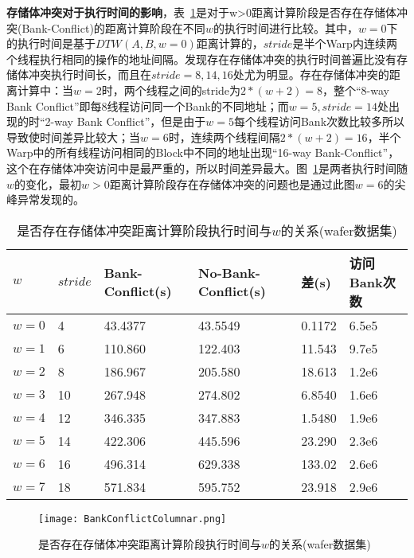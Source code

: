 \textbf{存储体冲突对于执行时间的影响}，表~\ref{tab:BankConflictTimeWithW}是对于w>0距离计算阶段是否存在存储体冲突(Bank-Conflict)的距离计算阶段在不同$w$的执行时间进行比较。其中，$w=0$下的执行时间是基于$DTW(A,B,w=0)$距离计算的，$stride$是半个Warp内连续两个线程执行相同的操作的地址间隔。发现存在存储体冲突的执行时间普遍比没有存储体冲突执行时间长，而且在$stride=8,14,16$处尤为明显。存在存储体冲突的距离计算中：当$w=2$时，两个线程之间的stride为$2*(w+2)=8$，整个“8-way Bank Conflict”即每8线程访问同一个Bank的不同地址；而$w=5,stride=14$处出现的时“2-way Bank Conflict”，但是由于$w=5$每个线程访问Bank次数比较多所以导致使时间差异比较大；当$w=6$时，连续两个线程间隔$2*(w+2)=16$，半个Warp中的所有线程访问相同的Block中不同的地址出现“16-way Bank-Conflict”，这个在存储体冲突访问中是最严重的，所以时间差异最大。图~\ref{fig:BankConflictColumnar}是两者执行时间随$w$的变化，最初$w>0$距离计算阶段存在存储体冲突的问题也是通过此图$w=6$的尖峰异常发现的。

\begin{table}[htbp]
	\centering
	\begin{minipage}{0.9\textwidth}
		\caption{是否存在存储体冲突距离计算阶段执行时间与$w$的关系(wafer数据集)}
		\label{tab:BankConflictTimeWithW}
		\begin{tabular}{p{2cm}p{1cm}p{2cm}p{2cm}p{2cm}p{2cm}}
			\toprule[1.5pt]
			{\heiti $w$ } &{\heiti $stride$ } &{\heiti Bank-Conflict(s) } &{\heiti No-Bank-Conflict(s) } &{\heiti 差(s) } &{\heiti 访问Bank次数 }
			\\\midrule[1pt]							
				$w=0$ & 4 & 43.4377 & 43.5549 & 0.1172 & 6.5e5 \\
				$w=1$ & 6 & 110.860 & 122.403 & 11.543 & 9.7e5 \\
				$w=2$ & 8 & 186.967 & 205.580 & 18.613 & 1.2e6 \\
				$w=3$ & 10 & 267.948 & 274.802 & 6.8540 & 1.6e6 \\
				$w=4$ & 12 & 346.335 & 347.883 & 1.5480 & 1.9e6 \\
				$w=5$ & 14 & 422.306 & 445.596 & 23.290 & 2.3e6 \\
				$w=6$ & 16 & 496.314 & 629.338 & 133.02 & 2.6e6 \\
				$w=7$ & 18 & 571.834 & 595.752 & 23.918 & 2.9e6 \\
			\bottomrule[1.5pt]
		\end{tabular}
	\end{minipage}
\end{table}

\begin{figure}[H] %
		\centering
		\texttt{[image: BankConflictColumnar.png]}
		\caption{是否存在存储体冲突距离计算阶段执行时间与$w$的关系(wafer数据集)}
		\label{fig:BankConflictColumnar}
\end{figure}



